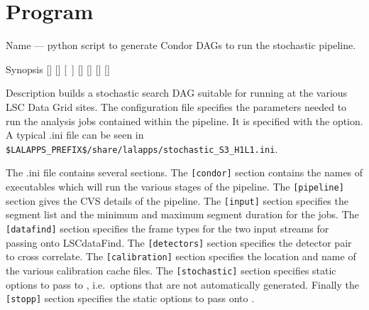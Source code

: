 \section{Program }
\label{program:lalapps-stochastic-pipe}

\begin{entry}
\item[Name]
 --- python script to generate Condor DAGs
to run the stochastic pipeline.

\item[Synopsis]
 \newline \hspace*{0.5in}
[] \newline \hspace*{0.5in}
[] \newline \hspace*{0.5in}
[~] \newline \hspace*{0.5in}
[] \newline \hspace*{0.5in}
[] \newline \hspace*{0.5in}
[] \newline \hspace*{0.5in}
[] \newline \hspace*{0.5in}
~ \newline \hspace*{0.5in}
~

\item[Description]
 builds a stochastic search DAG suitable
for running at the various LSC Data Grid sites. The configuration file
specifies the parameters needed to run the analysis jobs contained
within the pipeline. It is specified with the 
option. A typical .ini file can be seen in\\
\texttt{\$LALAPPS\_PREFIX\$/share/lalapps/stochastic\_S3\_H1L1.ini}.

The .ini file contains several sections. The \verb$[condor]$ section
contains the names of executables which will run the various stages of
the pipeline. The \verb$[pipeline]$ section gives the CVS details of the
pipeline. The \verb$[input]$ section specifies the segment list and the
minimum and maximum segment duration for the jobs. The \verb$[datafind]$
section specifies the frame types for the two input streams for passing
onto LSCdataFind. The \verb$[detectors]$ section specifies the detector
pair to cross correlate. The \verb$[calibration]$ section specifies the
location and name of the various calibration cache files. The
\verb$[stochastic]$ section specifies static options to pass to
, i.e.~options that are not automatically
generated. Finally the \verb$[stopp]$ section specifies the static
options to pass onto .


\end{entry}
